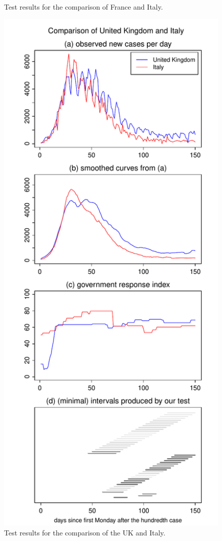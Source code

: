 \documentclass[a4paper,12pt]{article}
\numberwithin{equation}{section}
\begin{document}
\begin{figure}[h!]
\begin{minipage}[t]{0.49\textwidth}
\caption{Test results for the comparison of France and Italy.}\label{fig:France:Italy}
\end{minipage}
\hspace{0.25cm}
\begin{minipage}[t]{0.49\textwidth}
\includegraphics[width=\textwidth]{plots/GBR_vs_ITA}
\caption{Test results for the comparison of the UK and Italy.}
\end{minipage}
\end{figure}
\end{document}
